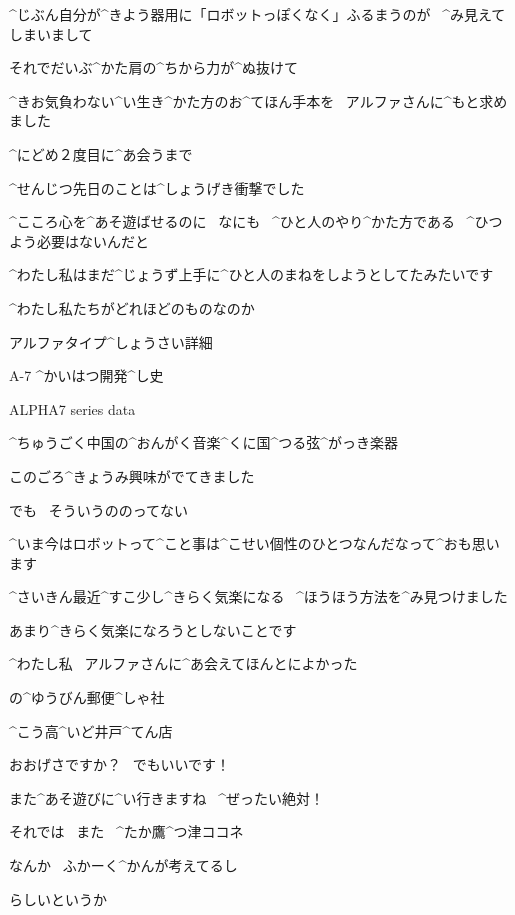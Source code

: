 \Kokone ^{じぶん}{自分}が^{きよう}{器用}に「ロボットっぽくなく」ふるまうのが
\ ^{み}{見}えてしまいまして

\Kokone それでだいぶ^{かた}{肩}の^{ちから}{力}が^{ぬ}{抜}けて

\Kokone ^{きお}{気負}わない^{い}{生}き^{かた}{方}のお^{てほん}{手本}を
\ アルファさんに^{もと}{求}めました

\Kokone ^{にどめ}{２度目}に^{あ}{会}うまで

\page[44]
\Kokone ^{せんじつ}{先日}のことは^{しょうげき}{衝撃}でした

\Kokone ^{こころ}{心}を^{あそ}{遊}ばせるのに
\ なにも
\ ^{ひと}{人}のやり^{かた}{方}である
\ ^{ひつよう}{必要}はないんだと

\Kokone ^{わたし}{私}はまだ^{じょうず}{上手}に^{ひと}{人}のまねをしようとしてたみたいです

\page[45]
\Kokone ^{わたし}{私}たちがどれほどのものなのか

\Sign アルファタイプ^{しょうさい}{詳細}

\Sign A-7 ^{かいはつ}{開発}^{し}{史}

\Sign ALPHA7 series data

\Sign ^{ちゅうごく}{中国}の^{おんがく}{音楽}^{くに}{国}^{つる}{弦}^{がっき}{楽器}

\page[46]
\Kokone このごろ^{きょうみ}{興味}がでてきました

\Kokone でも
\ そういうののってない

\Kokone ^{いま}{今}はロボットって^{こと}{事}は^{こせい}{個性}のひとつなんだなって^{おも}{思}います

\page[47]
\Kokone ^{さいきん}{最近}^{すこ}{少}し^{きらく}{気楽}になる
\ ^{ほうほう}{方法}を^{み}{見}つけました

\Kokone あまり^{きらく}{気楽}になろうとしないことです

\page[48]
\Kokone ^{わたし}{私}
\ アルファさんに^{あ}{会}えてほんとによかった

\Sign の^{ゆうびん}{郵便}^{しゃ}{社}

\Sign ^{こう}{高}^{いど}{井戸}^{てん}{店}

\Kokone おおげさですか？
\ でもいいです！

\page[49]
\Kokone また^{あそ}{遊}びに^{い}{行}きますね
\ ^{ぜったい}{絶対}！

\page[50]
\Kokone それでは
\ また
\ ^{たか}{鷹}^{つ}{津}ココネ

\Alpha なんか
\ ふかーく^{かんが}{考}えてるし

\Alpha らしいというか


